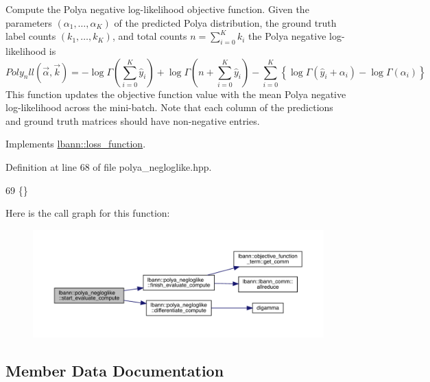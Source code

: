 Compute the Polya negative log-\/likelihood objective function. Given the parameters $(\alpha_1,\dots,\alpha_K)$ of the predicted Polya distribution, the ground truth label counts $(k_1,\dots,k_K)$, and total counts $n = \sum_{i=0}^K k_i$ the Polya negative log-\/likelihood is \[ Poly_nll(\vec{\alpha}, \vec{k}) = -\log \Gamma(\sum_{i=0}^K \hat{y}_i) + \log \Gamma(n + \sum_{i=0}^K \hat{y}_i) - \sum_{i=0}^K \left\{\log \Gamma(\hat{y}_i + \alpha_i) - \log \Gamma(\alpha_i) \right\} \] This function updates the objective function value with the mean Polya negative log-\/likelihood across the mini-\/batch. Note that each column of the predictions and ground truth matrices should have non-\/negative entries. 

Implements \hyperlink{classlbann_1_1loss__function_a0bbe41060d788dc7a29f3737761a6f7d}{lbann\+::loss\+\_\+function}.



Definition at line 68 of file polya\+\_\+negloglike.\+hpp.


\begin{DoxyCode}
69                                                                        \{\}
\end{DoxyCode}
Here is the call graph for this function\+:\nopagebreak
\begin{figure}[H]
\begin{center}
\leavevmode
\includegraphics[width=350pt]{classlbann_1_1polya__negloglike_aea7e92b3d290f3d11b6f8c93f9f9d3e6_cgraph}
\end{center}
\end{figure}


\subsection{Member Data Documentation}
\mbox{\label{classlbann_1_1polya__negloglike_aa77620f256de700ae8b3ca921957bcd1}} 
